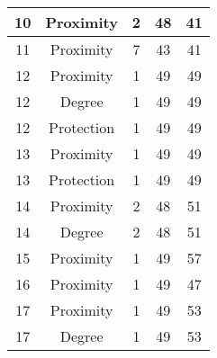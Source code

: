 \documentclass[results.tex]{subfiles}
\begin{document}
\begin{center}
\begin{tabular}{| c || c | c | c | c |}
            \hline
            10                      & Proximity                    & 2                      & 48                      & 41                   \\
            \hline
            11                      & Proximity                    & 7                      & 43                      & 41                   \\
            \hline
            12                      & Proximity                    & 1                      & 49                      & 49                   \\
            \hline
            12                      & Degree                       & 1                      & 49                      & 49                   \\
            \hline
            12                      & Protection                   & 1                      & 49                      & 49                   \\
            \hline
            13                      & Proximity                    & 1                      & 49                      & 49                   \\
            \hline
            13                      & Protection                   & 1                      & 49                      & 49                   \\
            \hline
            14                      & Proximity                    & 2                      & 48                      & 51                   \\
            \hline
            14                      & Degree                       & 2                      & 48                      & 51                   \\
            \hline
            15                      & Proximity                    & 1                      & 49                      & 57                   \\
            \hline
            16                      & Proximity                    & 1                      & 49                      & 47                   \\
            \hline
            17                      & Proximity                    & 1                      & 49                      & 53                   \\
            \hline
            17                      & Degree                       & 1                      & 49                      & 53                   \\

\end{tabular}
\end{center}
\end{document}
